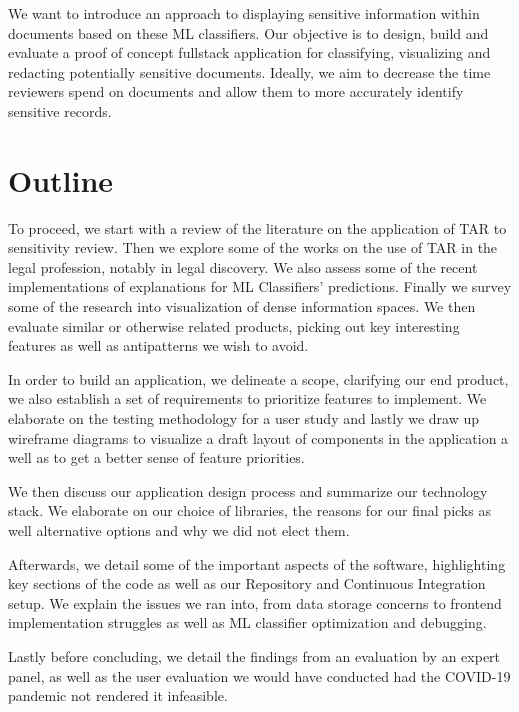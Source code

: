 \documentclass[\version]{l4proj}
\begin{document}
We want to introduce an approach to displaying sensitive information within documents based on these ML classifiers.
Our objective is to design, build and evaluate a proof of concept fullstack application for classifying, visualizing and redacting potentially sensitive documents.
Ideally, we aim to decrease the time reviewers spend on documents and allow them to more accurately identify sensitive records.

\section{Outline}

To proceed, we start with a review of the literature on the application of TAR to sensitivity review.
Then we explore some of the works on the use of TAR in the legal profession, notably in legal discovery.
We also assess some of the recent implementations of explanations for ML Classifiers' predictions.
Finally we survey some of the research into visualization of dense information spaces.
We then evaluate similar or otherwise related products, picking out key interesting features as well as antipatterns we wish to avoid.

In order to build an application, we delineate a scope, clarifying our end product, we also establish a set of requirements to prioritize features to implement.
We elaborate on the testing methodology for a user study and lastly we draw up wireframe diagrams to visualize a draft layout of components in the application a well as to get a better sense of feature priorities.

We then discuss our application design process and summarize our technology stack. We elaborate on our choice of libraries, the reasons for our final picks as well alternative options and why we did not elect them.

Afterwards, we detail some of the important aspects of the software, highlighting key sections of the code as well as our Repository and Continuous Integration setup.
We explain the issues we ran into, from data storage concerns to frontend implementation struggles as well as ML classifier optimization and debugging.

Lastly before concluding, we detail the findings from an evaluation by an expert panel, as well as the user evaluation we would have conducted had the COVID-19 pandemic not rendered it infeasible.


\end{document}
